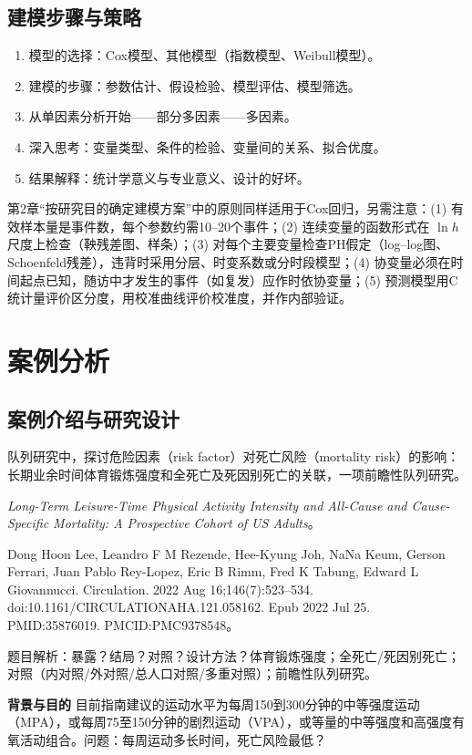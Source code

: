 \subsection{建模步骤与策略}
\begin{enumerate}
\item 模型的选择：Cox模型、其他模型（指数模型、Weibull模型）。
\item 建模的步骤：参数估计、假设检验、模型评估、模型筛选。
\item 从单因素分析开始——部分多因素——多因素。
\item 深入思考：变量类型、条件的检验、变量间的关系、拟合优度。
\item 结果解释：统计学意义与专业意义、设计的好坏。
\end{enumerate}
第2章“按研究目的确定建模方案”中的原则同样适用于Cox回归，另需注意：(1) 有效样本量是事件数，每个参数约需10--20个事件；(2) 连续变量的函数形式在 $\ln h$ 尺度上检查（鞅残差图、样条）；(3) 对每个主要变量检查PH假定（log--log图、Schoenfeld残差），违背时采用分层、时变系数或分时段模型；(4) 协变量必须在时间起点已知，随访中才发生的事件（如复发）应作时依协变量；(5) 预测模型用C统计量评价区分度，用校准曲线评价校准度，并作内部验证。
\section{案例分析}
\subsection{案例介绍与研究设计}
队列研究中，探讨危险因素（risk factor）对死亡风险（mortality risk）的影响：长期业余时间体育锻炼强度和全死亡及死因别死亡的关联，一项前瞻性队列研究。

\textit{Long-Term Leisure-Time Physical Activity Intensity and All-Cause and Cause-Specific Mortality: A Prospective Cohort of US Adults}。

Dong Hoon Lee, Leandro F M Rezende, Hee-Kyung Joh, NaNa Keum, Gerson Ferrari, Juan Pablo Rey-Lopez, Eric B Rimm, Fred K Tabung, Edward L Giovannucci. Circulation. 2022 Aug 16;146(7):523--534. doi:10.1161/CIRCULATIONAHA.121.058162. Epub 2022 Jul 25. PMID:35876019. PMCID:PMC9378548。

题目解析：暴露？结局？对照？设计方法？体育锻炼强度；全死亡/死因别死亡；对照（内对照/外对照/总人口对照/多重对照）；前瞻性队列研究。

\textbf{背景与目的} 目前指南建议的运动水平为每周150到300分钟的中等强度运动（MPA），或每周75至150分钟的剧烈运动（VPA），或等量的中等强度和高强度有氧活动组合。问题：每周运动多长时间，死亡风险最低？
